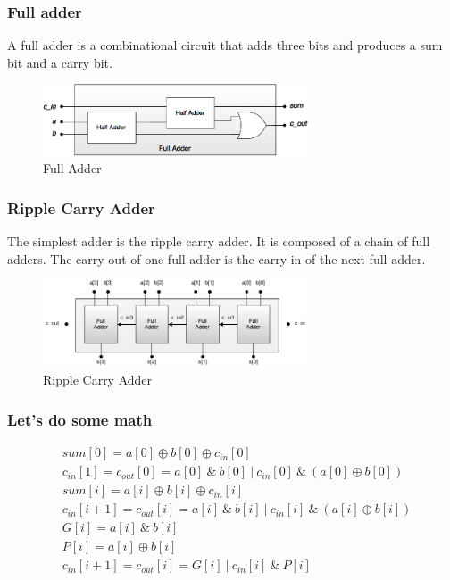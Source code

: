 \begin{frame}
    \frametitle{Full adder}
    A full adder is a combinational circuit that adds three bits and produces a sum bit and a carry bit.
    \begin{figure}
        \centering
        \includegraphics[width=0.7\textwidth]{media/full-adder-gates.png}
        \caption{Full Adder}
    \end{figure}
\end{frame}

\begin{frame}
    \frametitle{Ripple Carry Adder}
    The simplest adder is the ripple carry adder. It is composed of a chain of full adders. The carry out of one full adder is the carry in of the next full adder.
    \begin{figure}
        \centering
        \includegraphics[width=0.7\textwidth]{media/ripple-carry.png}
        \caption{Ripple Carry Adder}
    \end{figure}
\end{frame}

\begin{frame}
    \frametitle{Let's do some math}
    \begin{equation}
        \begin{aligned}
            &sum[0]=a[0] \oplus b[0] \oplus c_{in}[0]\\
            &c_{in}[1]=c_{out}[0]=a[0]\ \& \ b[0] \ | \ c_{in}[0] \ \& \ (a[0] \oplus b[0])\\
            &sum[i]=a[i] \oplus b[i] \oplus c_{in}[i]\\
            &c_{in}[i+1]=c_{out}[i]=a[i] \ \& \ b[i] \ | \ c_{in}[i] \ \& \ (a[i] \oplus b[i])\\
            &G[i]=a[i] \ \& \ b[i]\\
            &P[i]=a[i] \oplus b[i]\\
            &c_{in}[i+1]=c_{out}[i]=G[i] \ | \ c_{in}[i] \ \& \ P[i]
        \end{aligned}
    \end{equation}
\end{frame}


